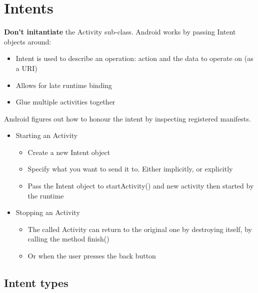 \documentclass{article}
\begin{document}
\section{Intents}
\textbf{Don't initantiate} the Activity sub-class. Android works by passing Intent objects around:
\begin{itemize}
  \item Intent is used to describe an operation: action and the data to operate on (as a URI)
  \item Allows for late runtime binding
  \item Glue multiple activities together
\end{itemize}
Android figures out how to honour the intent by inspecting registered manifests.
\begin{itemize}
  \item Starting an Activity
  \begin{itemize}
    \item Create a new Intent object
    \item Specify what you want to send it to. Either implicitly, or explicitly
    \item Pass the Intent object to startActivity() and new activity then started by the runtime 
  \end{itemize}
  \item Stopping an Activity
  \begin{itemize}
    \item The called Activity can return to the original one by destroying itself, by calling the method finish()
    \item Or when the user presses the back button
  \end{itemize}
\end{itemize}

\subsection{Intent types}
\end{document}
